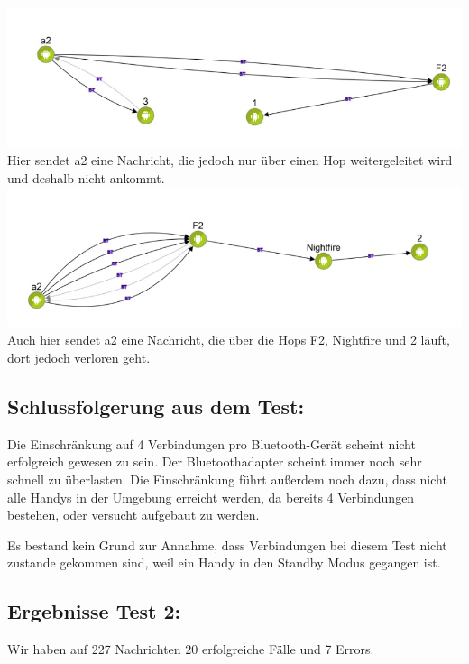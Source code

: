 \includegraphics{belege/grosstests/Bilder/Grosstest2/Test1Misserfolg1.jpg}
Hier sendet a2 eine Nachricht, die jedoch nur über einen Hop
weitergeleitet wird und deshalb nicht ankommt.
\includegraphics{belege/grosstests/Bilder/Grosstest2/Test1Misserfolg3.jpg}
Auch hier sendet a2 eine Nachricht, die über die Hops F2, Nightfire und
2 läuft, dort jedoch verloren geht.

\clearpage\subsection{Schlussfolgerung aus dem
Test:}\label{schlussfolgerung-aus-dem-test-2}

Die Einschränkung auf 4 Verbindungen pro Bluetooth-Gerät scheint nicht
erfolgreich gewesen zu sein. Der Bluetoothadapter scheint immer noch
sehr schnell zu überlasten. Die Einschränkung führt außerdem noch dazu,
dass nicht alle Handys in der Umgebung erreicht werden, da bereits 4
Verbindungen bestehen, oder versucht aufgebaut zu werden.

Es bestand kein Grund zur Annahme, dass Verbindungen bei diesem Test
nicht zustande gekommen sind, weil ein Handy in den Standby Modus
gegangen ist.

\clearpage\subsection{Ergebnisse Test 2:}\label{ergebnisse-test-2-1}

Wir haben auf 227 Nachrichten 20 erfolgreiche Fälle und 7 Errors.

